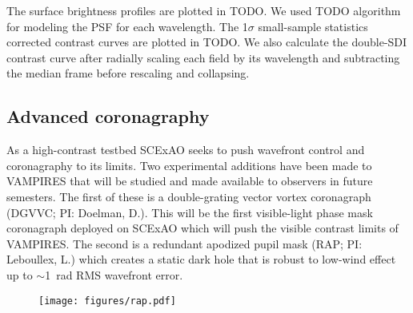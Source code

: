 The surface brightness profiles are plotted in TODO. We used TODO algorithm for modeling the PSF for each wavelength. The 1$\sigma$ small-sample statistics corrected contrast curves \citep{mawet_fundamental_2014} are plotted in TODO. We also calculate the double-SDI contrast curve after radially scaling each field by its wavelength and subtracting the median frame before rescaling and collapsing.

\subsection{Advanced coronagraphy}

As a high-contrast testbed SCExAO seeks to push wavefront control and coronagraphy to its limits. Two experimental additions have been made to VAMPIRES that will be studied and made available to observers in future semesters. The first of these is a double-grating vector vortex coronagraph (DGVVC; PI: Doelman, D.). This will be the first visible-light phase mask coronagraph deployed on SCExAO which will push the visible contrast limits of VAMPIRES. The second is a redundant apodized pupil mask (RAP; PI: Leboullex, L.) which creates a static dark hole that is robust to low-wind effect up to $\sim$\SI{1}{rad} RMS wavefront error.


\begin{figure}
    \centering
    \texttt{[image: figures/rap.pdf]}
    \caption{\label{fig:rap}}
\end{figure}
